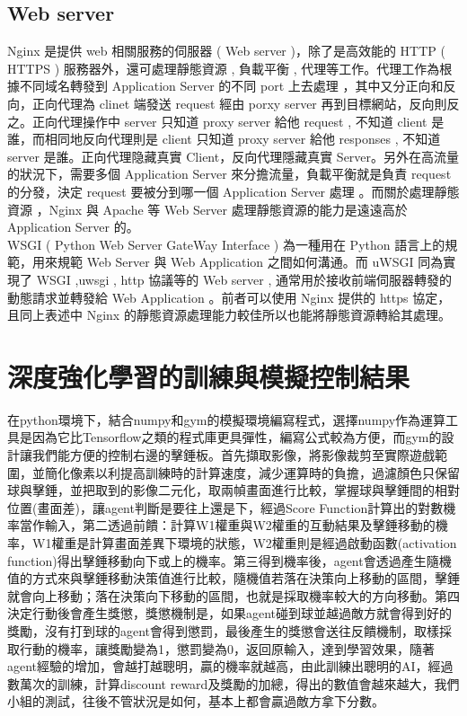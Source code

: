 \documentclass[14pt,a4paper]{report}  %
\begin{document}
\section{Web server}
\qquad Nginx 是提供 web 相關服務的伺服器 ( Web server )，除了是高效能的 HTTP ( HTTPS ) 服務器外，還可處理靜態資源 , 負載平衡 , 代理等工作。代理工作為根據不同域名轉發到 Application Server 的不同 port 上去處理 ，其中又分正向和反向，正向代理為 clinet 端發送 request 經由 porxy server 再到目標網站，反向則反之。正向代理操作中 server 只知道 proxy server  給他 request , 不知道 client 是誰，而相同地反向代理則是 client 只知道 proxy server 給他 responses , 不知道 server 是誰。正向代理隐藏真實 Client，反向代理隱藏真實 Server。另外在高流量的狀況下，需要多個 Application Server 來分擔流量，負載平衡就是負責 request 的分發，決定 request 要被分到哪一個 Application Server 處理 。而關於處理靜態資源 ，Nginx 與 Apache 等 Web Server 處理靜態資源的能力是遠遠高於 Application Server 的。\\
\qquad WSGI ( Python Web Server GateWay Interface ) 為一種用在 Python 語言上的規範，用來規範 Web Server 與 Web Application 之間如何溝通。而 uWSGI 同為實現了 WSGI ,uwsgi , http 協議等的 Web server , 通常用於接收前端伺服器轉發的動態請求並轉發給 Web Application 。前者可以使用 Nginx 提供的 https 協定，且同上表述中 Nginx 的靜態資源處理能力較佳所以也能將靜態資源轉給其處理。\\
\newpage
\chapter{深度強化學習的訓練與模擬控制結果}
\qquad 在python環境下，結合numpy和gym的模擬環境編寫程式，選擇numpy作為運算工具是因為它比Tensorflow之類的程式庫更具彈性，編寫公式較為方便，而gym的設計讓我們能方便的控制右邊的擊錘板。首先擷取影像，將影像裁剪至實際遊戲範圍，並簡化像素以利提高訓練時的計算速度，減少運算時的負擔，過濾顏色只保留球與擊錘，並把取到的影像二元化，取兩幀畫面進行比較，掌握球與擊錘間的相對位置(畫面差)，讓agent判斷是要往上還是下，經過Score Function計算出的對數機率當作輸入，第二透過前饋：計算W1權重與W2權重的互動結果及擊錘移動的機率，W1權重是計算畫面差異下環境的狀態，W2權重則是經過啟動函數(activation function)得出擊錘移動向下或上的機率。第三得到機率後，agent會透過產生隨機值的方式來與擊錘移動決策值進行比較，隨機值若落在決策向上移動的區間，擊錘就會向上移動；落在決策向下移動的區間，也就是採取機率較大的方向移動。第四決定行動後會產生獎懲，獎懲機制是，如果agent碰到球並越過敵方就會得到好的獎勵，沒有打到球的agent會得到懲罰，最後產生的獎懲會送往反饋機制，取樣採取行動的機率，讓獎勵變為1，懲罰變為0，返回原輸入，達到學習效果，隨著agent經驗的增加，會越打越聰明，贏的機率就越高，由此訓練出聰明的AI，經過數萬次的訓練，計算discount reward及獎勵的加總，得出的數值會越來越大，我們小組的測試，往後不管狀況是如何，基本上都會贏過敵方拿下分數。\\[12pt]
\end{document}
